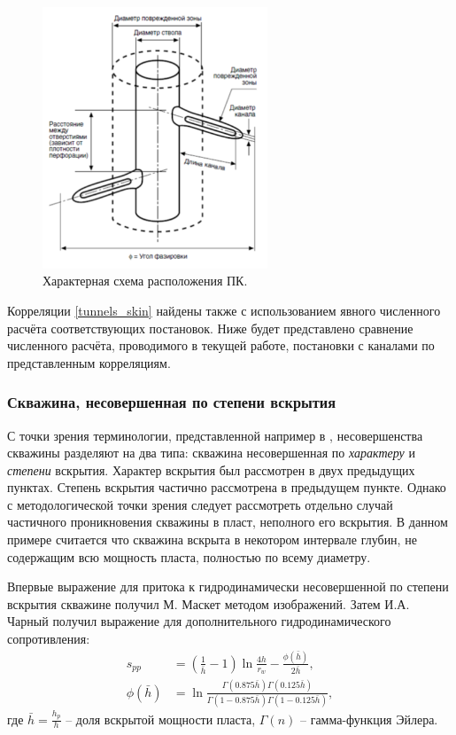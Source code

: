 \begin{figure}[H]
	\centerline{\includegraphics[width=0.6\textwidth]{pic/tunnels.png}}
	\caption{Характерная схема расположения ПК.}
	\label{pic:tunnels}
\end{figure}

	Корреляции \eqref{tunnels_skin} найдены также с использованием явного численного расчёта соответствующих постановок. Ниже будет представлено сравнение численного расчёта, проводимого в текущей работе, постановки с каналами по представленным корреляциям.

\subsubsection{Скважина, несовершенная по степени вскрытия}
	
	С точки зрения терминологии, представленной например в \cite{basniev}, несовершенства скважины разделяют на два типа: скважина несовершенная по \textit{характеру} и \textit{степени} вскрытия. Характер вскрытия был рассмотрен в двух предыдущих пунктах. Степень вскрытия частично рассмотрена в предыдущем пункте. Однако с методологической точки зрения следует рассмотреть отдельно случай частичного проникновения скважины в пласт, неполного его вскрытия.
В данном примере считается что скважина вскрыта в некотором интервале глубин, не содержащим всю мощность пласта, полностью по всему диаметру.

	Впервые выражение для притока к гидродинамически несовершенной по степени вскрытия скважине получил М. Маскет \cite{masket} методом изображений.
	Затем И.А. Чарный \cite{charniy} получил выражение для дополнительного гидродинамического сопротивления:
\begin{align}
	\label{skin_part_penetr}
	s_{pp} &= \left(\frac{1}{\bar{h}}-1\right)\ln\frac{4h}{r_w}-\frac{\phi(\bar{h})}{2\bar{h}}, \\
	\phi(\bar{h}) &= \ln\frac{\Gamma(0.875\bar{h})\Gamma(0.125\bar{h})}{\Gamma(1-0.875\bar{h})\Gamma(1-0.125\bar{h})},\nonumber
\end{align}
	где $\bar{h} = \displaystyle\frac{h_p}{h}$ -- доля вскрытой мощности пласта, $\Gamma(n)$ -- гамма-функция Эйлера.

